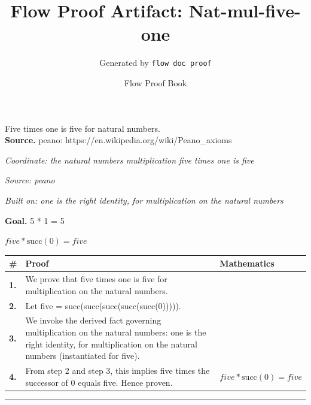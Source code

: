 \documentclass[11pt]{article}
\title{Flow Proof Artifact: Nat-mul-five-one}
\author{Generated by \texttt{flow doc proof}}
\date{Flow Proof Book}
\theoremstyle{definition}
\begin{document}
\maketitle
Five times one is five for natural numbers.\\[0.5em]
\textbf{Source.} peano: https://en.wikipedia.org/wiki/Peano\_axioms\\[0.5em]
\bigskip
{}\par
\smallskip\noindent\textit{Coordinate: the natural numbers \cdot multiplication \cdot five times one is five}\par
\smallskip\noindent\textit{Source: peano}\par
\smallskip\noindent\textit{Built on: one is the right identity, for multiplication on the natural numbers}\par
\medskip
\noindent\textbf{Goal.} 5 * 1 = 5\par
\noindent$\displaystyle five * \mathrm{succ}(0) = five$\par
\medskip
\noindent
\begin{tabular}{@{} >{\raggedright\arraybackslash}p{} >{\raggedright\arraybackslash}p{} >{\raggedleft\arraybackslash}p{} @{}}
\textbf{\#} & \textbf{Proof} & \textbf{Mathematics} \\
\midrule
\textbf{1.} & We prove that five times one is five for multiplication on the natural numbers. & \\[0.45em]
\textbf{2.} & Let five = succ(succ(succ(succ(succ(0))))). & \\[0.45em]
\textbf{3.} & We invoke the derived fact governing multiplication on the natural numbers: one is the right identity, for multiplication on the natural numbers (instantiated for five). & \\[0.45em]
\textbf{4.} & From step 2 and step 3, this implies five times the successor of 0 equals five. Hence proven. & $\displaystyle five * \mathrm{succ}(0) = five$ \\[0.45em]
\bottomrule
\end{tabular}
\label{thm:Nat-multiplication-five_times_one_is_five}
\par\medskip\hrule
\end{document}
